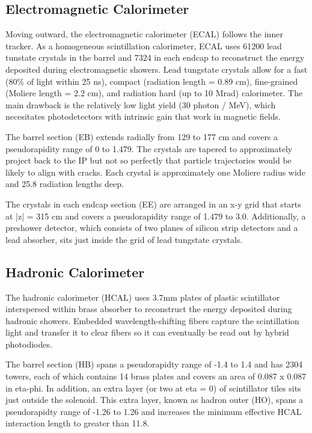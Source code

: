 \documentclass[12pt]{article}
\begin{document}
\subsection{Electromagnetic Calorimeter}
        Moving outward, the electromagnetic calorimeter (ECAL) follows the inner tracker. As a homogeneous scintillation calorimeter, ECAL uses 61200 lead tunstate crystals in the barrel and 7324 in each endcap to reconstruct the energy deposited during electromagnetic showers. Lead tungstate crystals allow for a fast (80\% of light within 25 ns), compact (radiation length = 0.89 cm), fine-grained (Moliere length = 2.2 cm), and radiation hard (up to 10 Mrad) calorimeter. The main drawback is the relatively low light yield (30 photon / MeV), which necesitates photodetectors with intrinsic gain that work in magnetic fields. 

        The barrel section (EB) extends radially from 129 to 177 cm and covers a pseudorapidity range of 0 to 1.479. The crystals are tapered to approximately project back to the IP but not so perfectly that particle trajectories would be likely to align with cracks. Each crystal is approximately one Moliere radius wide and 25.8 radiation lengths deep.

        The crystals in each endcap section (EE) are arranged in an x-y grid that starts at |z| = 315 cm and covers a pseudorapidity range of 1.479 to 3.0. Additionally, a preshower detector, which consists of two planes of silicon strip detectors and a lead absorber, sits just inside the grid of lead tungstate crystals.

\subsection{Hadronic Calorimeter}
        The hadronic calorimeter (HCAL) uses 3.7mm plates of plastic scintillator interspersed within brass absorber to reconstruct the energy deposited during hadronic showers. Embedded wavelength-shifting fibers capture the scintillation light and transfer it to clear fibers so it can eventually be read out by hybrid photodiodes.

        The barrel section (HB) spans a pseudorapidty range of -1.4 to 1.4 and has 2304 towers, each of which contains 14 brass plates and covers an area of 0.087 x 0.087 in eta-phi. In addition, an extra layer (or two at eta = 0) of scintillator tiles sits just outside the solenoid. This extra layer, known as hadron outer (HO), spans a pseudorapidty range of -1.26 to 1.26 and increases the minimum effective HCAL interaction length to greater than 11.8.
\end{document}
